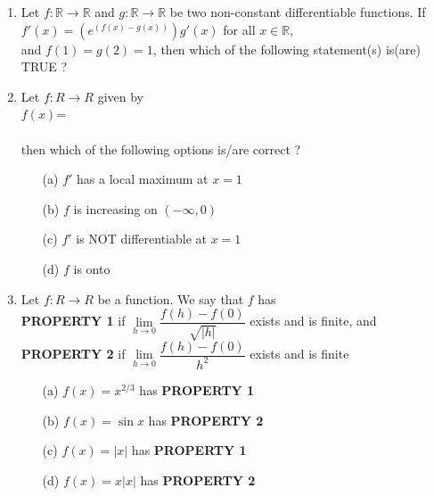 \begin{enumerate}[label=\arabic*.,ref=\thesubsection.\theenumi]
\item Let $f:\mathbb{R} \to \mathbb{R}$ and $g:\mathbb{R} \to \mathbb{R}$ be two non-constant differentiable functions. If\\
$f'(x)=\left(e^{(f(x)-g(x))}\right)g'(x)$ for all $x \in \mathbb{R}$,
\\ and $f(1)=g(2)=1$, then which of the following statement(s) is(are) TRUE ?
\begin{itemize}
\end{itemize}

\item Let $f:R \to R$ given by\\ $f(x)$= \\ \\then which of the following options is/are correct ?
\begin{itemize}
\item[(a)] $f'$ has a local maximum at $x=1$
\item[(b)] $f$ is increasing on $(-\infty,0)$
\item[(c)] $f'$ is NOT differentiable at $x=1$
\item[(d)] $f$ is onto
\end{itemize}

\item Let $f:R \to R$ be a function. We say that $f$ has \\
\textbf{PROPERTY 1} if $\lim\limits_{h \to 0}\dfrac{f(h)-f(0)}{\sqrt{|h|}}$ exists and is finite, and \\
\textbf{PROPERTY 2} if $\lim\limits_{h \to 0}\dfrac{f(h)-f(0)}{h^2}$ exists and is finite\\
\begin{itemize}
\item[(a)] $f(x)=x^{2/3}$ has \textbf{PROPERTY 1}
\item[(b)] $f(x)=\sin x$ has \textbf{PROPERTY 2}
\item[(c)] $f(x)=|x|$ has \textbf{PROPERTY 1}
\item[(d)] $f(x)=x|x|$ has \textbf{PROPERTY 2}
\end{itemize} \item[~]


\end{enumerate}
